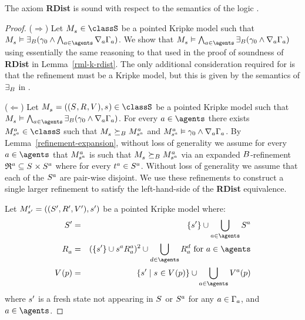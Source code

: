\begin{lemma}\label{rml-s5-rdist}
The axiom {\bf RDist} is sound with respect to the semantics of the logic \logicRmlS{}.
\end{lemma}

\begin{proof}
($\Rightarrow$)
Let $\kPModel{\kStateS} \in \classS$ be a pointed Kripke model such that $\kPModel{\kStateS} \entails \somerefsBs (\gamma_0 \land \bigwedge_{\agentA \in \agents} \coversA \Gamma_\agentA)$.
We show that $\kPModel{\kStateS} \entails \bigwedge_{\agentA \in \agents} \somerefsBs (\gamma_0 \land \coversA \Gamma_\agentA)$ using essentially the same reasoning to that used in the proof of soundness of {\bf RDist} in Lemma~\ref{rml-k-rdist}.
The only additional consideration required for \logicRmlS{} is that the refinement must be a \classS{} Kripke model, but this is given by the semantics of $\somerefsBs$ in \logicRmlS{}.

($\Leftarrow$)
Let $\kPModelAndTuple{\kStateS} \in \classS$ be a pointed Kripke model such that $\kPModel{\kStateS} \entails \bigwedge_{\agentA \in \agents} \somerefsBs (\gamma_0 \land \coversA \Gamma_\agentA)$.
For every $\agentA \in \agents$ there exists $\kPModel[\agentA]{\kStateS[\agentA]} \in \classS$ such that $\kPModel{\kStateS} \simulatesBs \kPModel[\agentA]{\kStateS[\agentA]}$ and $\kPModel[\agentA]{\kStateS[\agentA]} \entails \gamma_0 \land \coversA \Gamma_\agentA$.
By Lemma~\ref{refinement-expansion}, without loss of generality we assume for every $\agentA \in \agents$ that $\kPModel[\agentA]{\kStateS[\agentA]}$ is such that $\kPModel{\kStateS} \simulatesBs \kPModel[\agentA]{\kStateS[\agentA]}$ via an expanded $\agentsB$-refinement $\refinement^{\agentA} \subseteq \kStates \times \kStates[\agentA]$ where for every $\kStateT[\agentA] \in \kStates[\agentA]$.
Without loss of generality we assume that each of the $\kStates[\agentA]$ are pair-wise disjoint.
We use these refinements to construct a single larger refinement to satisfy the left-hand-side of the {\bf RDist} equivalence.

Let $\kPModelAndTupleP{\kStateSP}$ be a pointed Kripke model where:
\begin{eqnarray*}
    \kStatesP &=& \{\kStateSP\} \cup \bigcup_{\agentA \in \agents} \kStates[\agentA]\\
    \kAccessibilityA &=& (\{\kStateSP\} \cup \kSuccessorsA[\agentA]{\kStateS[\agentA]})^2 \cup \bigcup_{\agentD \in \agents} \kAccessibilityA[\agentD] \text{ for } \agentA \in \agents\\
    \kValuation(\atomP) &=& \{\kStateSP \mid \kStateS \in \kValuation(\atomP)\} \cup \bigcup_{\agentA \in \agents} \kValuation[\agentA](\atomP)
\end{eqnarray*}
where $\kStateSP$ is a fresh state not appearing in $\kStates$ or $\kStates[\agentA]$ for any $\agentA \in \Gamma_\agentA$, and $\agentA \in \agents$.


\end{proof}
